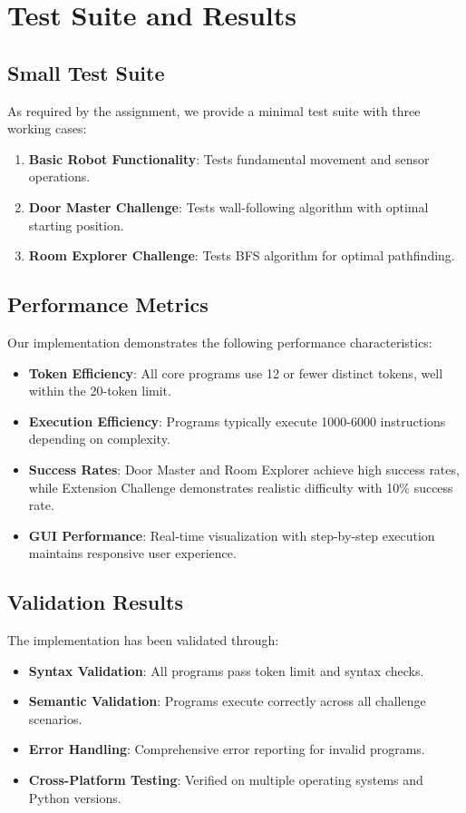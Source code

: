 \documentclass[11pt,a4paper]{article}
\begin{document}
\section{Test Suite and Results}
\subsection{Small Test Suite}
As required by the assignment, we provide a minimal test suite with three working cases:

\begin{enumerate}[noitemsep]
  \item \textbf{Basic Robot Functionality}: Tests fundamental movement and sensor operations.
  \item \textbf{Door Master Challenge}: Tests wall-following algorithm with optimal starting position.
  \item \textbf{Room Explorer Challenge}: Tests BFS algorithm for optimal pathfinding.
\end{enumerate}

\subsection{Performance Metrics}
Our implementation demonstrates the following performance characteristics:

\begin{itemize}[noitemsep]
  \item \textbf{Token Efficiency}: All core programs use 12 or fewer distinct tokens, well within the 20-token limit.
  \item \textbf{Execution Efficiency}: Programs typically execute 1000-6000 instructions depending on complexity.
  \item \textbf{Success Rates}: Door Master and Room Explorer achieve high success rates, while Extension Challenge demonstrates realistic difficulty with 10\% success rate.
  \item \textbf{GUI Performance}: Real-time visualization with step-by-step execution maintains responsive user experience.
\end{itemize}

\subsection{Validation Results}
The implementation has been validated through:

\begin{itemize}[noitemsep]
  \item \textbf{Syntax Validation}: All programs pass token limit and syntax checks.
  \item \textbf{Semantic Validation}: Programs execute correctly across all challenge scenarios.
  \item \textbf{Error Handling}: Comprehensive error reporting for invalid programs.
  \item \textbf{Cross-Platform Testing}: Verified on multiple operating systems and Python versions.
\end{itemize}
\end{document}
